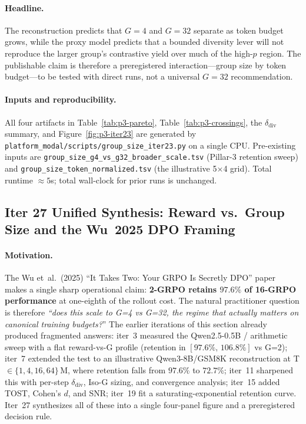\documentclass{article}
\begin{document}
\paragraph{Headline.}
The reconstruction predicts that $G{=}4$ and $G{=}32$ separate as token
budget grows, while the proxy model predicts that a bounded diversity lever
will not reproduce the larger group's contrastive yield over much of the
high-$p$ region.  The publishable claim is therefore a preregistered
interaction---group size by token budget---to be tested with direct runs,
not a universal $G{=}32$ recommendation.

\paragraph{Inputs and reproducibility.}
All four artifacts in Table~\ref{tab:p3-pareto}, Table~\ref{tab:p3-crossings},
the $\delta_\text{div}$ summary, and Figure~\ref{fig:p3-iter23} are generated by
\texttt{platform\_modal/scripts/group\_size\_iter23.py} on a single CPU.
Pre-existing inputs are
\texttt{group\_size\_g4\_vs\_g32\_broader\_scale.tsv} (Pillar-3 retention sweep)
and \texttt{group\_size\_token\_normalized.tsv} (the illustrative 5$\times$4 grid).
Total runtime $\!\approx\!5$s; total wall-clock for prior runs is unchanged.
 \subsection{Iter 27 Unified Synthesis: Reward vs.\ Group Size and the Wu~2025 DPO Framing}
\label{sec:group-size-iter27}

\paragraph{Motivation.}
The Wu et~al.\ (2025) ``It Takes Two: Your GRPO Is Secretly DPO''
paper~\cite{wu2025grpo_dpo} makes a single sharp operational claim:
\textbf{2-GRPO retains $97.6\%$ of 16-GRPO performance} at one-eighth
of the rollout cost. The natural practitioner question is therefore
\emph{``does this scale to G=4 vs G=32, the regime that actually
matters on canonical training budgets?}''  The earlier iterations of
this section already produced fragmented answers: iter~3 measured the
Qwen2.5-0.5B / arithmetic sweep with a flat reward-vs-G profile
(retention in $[97.6\%,\,106.8\%]$ vs G=2); iter~7 extended the test
to an illustrative Qwen3-8B/GSM8K reconstruction at
T$\in\{1,4,16,64\}$\,M, where retention falls from $97.6\%$ to
$72.7\%$; iter~11 sharpened
this with per-step $\delta_\text{div}$, Iso-G sizing, and convergence
analysis; iter~15 added TOST, Cohen's $d$, and SNR; iter~19 fit a
saturating-exponential retention curve. Iter~27 synthesizes all of
these into a single four-panel figure and a preregistered decision rule.
\end{document}
